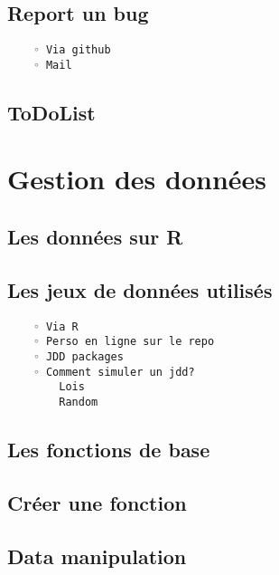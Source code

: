 \documentclass[
]{book}
\begin{document}
\hypertarget{report-un-bug}{%
\section{Report un bug}\label{report-un-bug}}

\begin{verbatim}
    ◦ Via github
    ◦ Mail
\end{verbatim}

\hypertarget{todolist}{%
\section{ToDoList}\label{todolist}}

\hypertarget{gestion-des-donnuxe9es}{%
\chapter{Gestion des données}\label{gestion-des-donnuxe9es}}

\hypertarget{les-donnuxe9es-sur-r}{%
\section{Les données sur R}\label{les-donnuxe9es-sur-r}}

\hypertarget{les-jeux-de-donnuxe9es-utilisuxe9s}{%
\section{Les jeux de données utilisés}\label{les-jeux-de-donnuxe9es-utilisuxe9s}}

\begin{verbatim}
    ◦ Via R
    ◦ Perso en ligne sur le repo
    ◦ JDD packages
    ◦ Comment simuler un jdd?
        Lois 
        Random 
\end{verbatim}

\hypertarget{les-fonctions-de-base}{%
\section{Les fonctions de base}\label{les-fonctions-de-base}}

\hypertarget{cruxe9er-une-fonction}{%
\section{Créer une fonction}\label{cruxe9er-une-fonction}}

\hypertarget{data-manipulation}{%
\section{Data manipulation}\label{data-manipulation}}
\end{document}

